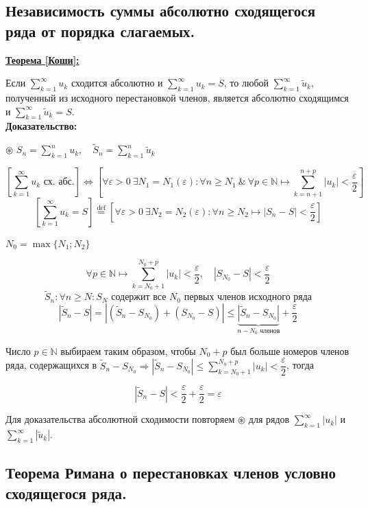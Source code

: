 \documentclass[a4paper,12pt]{article} %
\newcommand{\eqdef}{\stackrel{\mathrm{def}}{=}}
\newcommand{\N}{\mathbb{N}}
\newcommand{\useries}{\sum\limits_{k=1}^{\infty} u_k}
\newcommand{\auseries}{\sum\limits_{k=1}^{\infty} |u_k|}
\newcommand{\sn}{\sum\limits_{k=1}^{n} u_k}
\begin{document}
\subsection{Независимость суммы абсолютно сходящегося ряда от порядка слагаемых.}

\underline{\textbf{Теорема [Коши]:}}

Если $\useries$ сходится абсолютно и $\useries = S$, то любой $\sum\limits_{k=1}^{\infty} \tilde{u}_k$, полученный из исходного перестановкой членов, является абсолютно сходящимся и $\sum\limits_{k=1}^{\infty} \tilde{u}_k = S$.\\

\textbf{Доказательство:}

$\circledast$ $S_n = \sn, \hspace{1em} \tilde{S}_n = \sum\limits_{k=1}^{n} \tilde{u}_k$
	
\[\left[ \useries \text{ сх. абс.} \right] \Leftrightarrow \left[ \forall \varepsilon > 0 \ \exists N_1 = N_1(\varepsilon): \forall n \geqslant N_1 \ \& \ \forall p \in \N \mapsto \sum\limits_{k = n+1}^{n+p}|u_k| < \dfrac{\varepsilon}{2} \right] \]
\[ \left[ \useries = S \right] \eqdef \left[ \forall \varepsilon > 0 \ \exists N_2 = N_2(\varepsilon): \forall n \geqslant N_2 \mapsto \left| S_n - S \right| < \dfrac{\varepsilon}{2} \right] \]

$N_0 = \max \{ N_1; N_2 \}$

\[ \forall p \in \N \mapsto \sum\limits_{k = N_0 + 1}^{N_0 + p} |u_k| < \dfrac{\varepsilon}{2}, \hspace{1em} \left| S_{N_0} - S \right| < \dfrac{\varepsilon}{2} \]
\[\tilde{S}_n: \forall n \geqslant N: S_N \text{ содержит все } N_0 \text{ первых членов исходного ряда} \]
\[ |\tilde{S}_n - S| = |(\tilde{S}_n - S_{N_0}) + (S_{N_0} - S)| \leqslant \underbrace{|\tilde{S}_n - S_{N_0}|}_{n - N_0 \text{ членов}} + \dfrac{\varepsilon}{2} \]

Число $p \in \N$ выбираем таким образом, чтобы $N_0 + p$ был больше номеров членов ряда, содержащихся в $\tilde{S}_n - S_{N_0} \Rightarrow |\tilde{S}_n - S_{N_0}| \leqslant \sum\limits_{k=N_0 + 1}^{N_0 + p} |u_k| < \dfrac{\varepsilon}{2}$, тогда

\[ |\tilde{S}_n - S| < \dfrac{\varepsilon}{2} + \dfrac{\varepsilon}{2} = \varepsilon\]

Для доказательства абсолютной сходимости повторяем $\circledast$ для рядов $\auseries$ и $\sum\limits_{k=1}^{\infty}|\tilde{u}_k|$.

\subsection{Теорема Римана о перестановках членов условно сходящегося ряда.}
\end{document}
